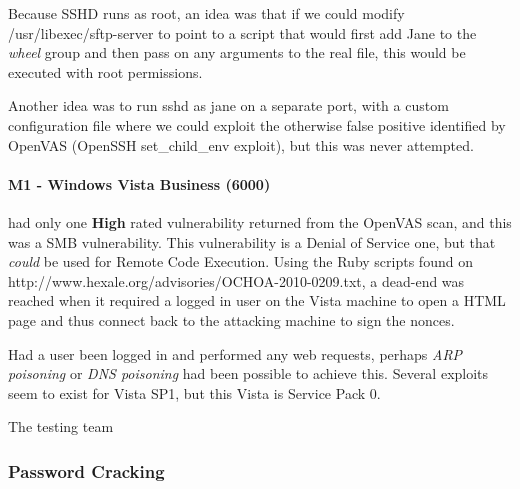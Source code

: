 Because SSHD runs as root, an idea was that if we could modify /usr/libexec/sftp-server to point to a script that would first add Jane to the \textit{wheel} group and then pass on any arguments to the real file, this would be executed with root permissions. 

Another idea was to run sshd as jane on a separate port, with a custom configuration file where we could exploit the otherwise false positive identified by OpenVAS (OpenSSH set\_child\_env exploit), but this was never attempted. 
 

\paragraph{M1 - Windows Vista Business (6000)}
had only one \textbf{High} rated vulnerability returned from the OpenVAS scan, and this was a SMB vulnerability. This vulnerability is a Denial of Service one, but that \textit{could} be used for Remote Code Execution. Using the Ruby scripts found on http://www.hexale.org/advisories/OCHOA-2010-0209.txt, a dead-end was reached when it required a logged in user on the Vista machine to open a HTML page and thus connect back to the attacking machine to sign the nonces.

Had a user been logged in and performed any web requests, perhaps \textit{ARP poisoning} or \textit{DNS poisoning} had been possible to achieve this. Several exploits seem to exist for Vista SP1, but this Vista is Service Pack 0.

The testing team 

\subsubsection{Password Cracking}

